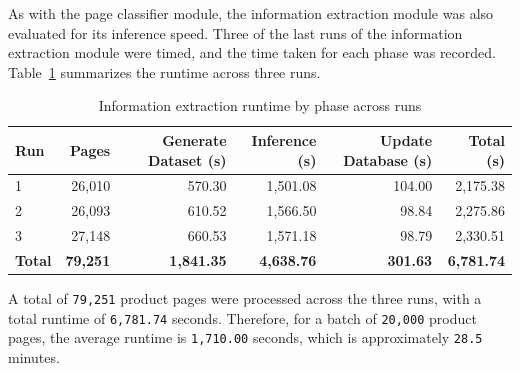 As with the page classifier module, the information extraction module was also evaluated for its inference speed.
Three of the last runs of the information extraction module were timed, and the time taken for each phase was recorded.
Table~\ref{tab:information-extraction-runtime} summarizes the runtime across three runs.

\begin{table}[H]
    \centering
    \begin{tabular}{lrrrrr}
        \toprule
        \textbf{Run} & \textbf{Pages} & \textbf{Generate Dataset (s)} & \textbf{Inference (s)} & \textbf{Update Database (s)} & \textbf{Total (s)} \\
        \midrule
        1 & 26,010 & 570.30 & 1,501.08 & 104.00 & 2,175.38 \\
        2 & 26,093 & 610.52 & 1,566.50 & 98.84 & 2,275.86 \\
        3 & 27,148 & 660.53 & 1,571.18 & 98.79 & 2,330.51 \\
        \midrule
        \textbf{Total} & \textbf{79,251} & \textbf{1,841.35} & \textbf{4,638.76} & \textbf{301.63} & \textbf{6,781.74} \\
        \bottomrule
    \end{tabular}
    \caption{Information extraction runtime by phase across runs}
    \label{tab:information-extraction-runtime}
\end{table}

A total of \texttt{79,251} product pages were processed across the three runs, with a total runtime of \texttt{6,781.74} seconds.
Therefore, for a batch of \texttt{20,000} product pages, the average runtime is \texttt{1,710.00} seconds, which is approximately \texttt{28.5} minutes.